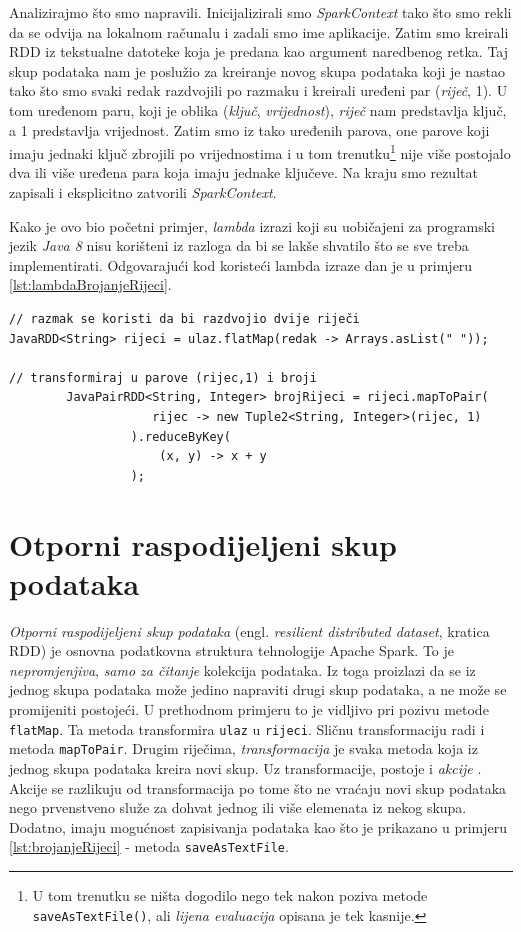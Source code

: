 \documentclass[times, utf8, zavrsni, numeric]{fer}
\begin{document}
Analizirajmo što smo napravili. Inicijalizirali smo \emph{SparkContext} tako što smo rekli da se odvija na lokalnom računalu i zadali smo ime aplikacije. Zatim smo kreirali RDD iz tekstualne datoteke koja je predana kao argument naredbenog retka. Taj skup podataka nam je poslužio za kreiranje novog skupa podataka koji je nastao tako što smo svaki redak razdvojili po razmaku i kreirali uređeni par (\emph{riječ}, 1). U tom uređenom paru, koji je oblika (\emph{ključ}, \emph{vrijednost}), \emph{riječ} nam predstavlja ključ, a 1 predstavlja vrijednost. Zatim smo iz tako uređenih parova, one parove koji imaju jednaki ključ zbrojili po vrijednostima i u tom trenutku\footnote{U tom trenutku se ništa dogodilo nego tek nakon poziva metode \texttt{saveAsTextFile()}, ali \emph{lijena evaluacija}  opisana je tek kasnije.} nije više postojalo dva ili više uređena para koja imaju jednake ključeve. Na kraju smo rezultat zapisali i eksplicitno zatvorili \emph{SparkContext}. 

Kako je ovo bio početni primjer, \emph{lambda} izrazi koji su uobičajeni za programski jezik \emph{Java 8} nisu korišteni iz razloga da bi se lakše shvatilo što se sve treba implementirati. Odgovarajući kod koristeći lambda izraze dan je u primjeru \ref{lst:lambdaBrojanjeRijeci}.
\vspace{5mm}
\begin{lstlisting}[label={lst:lambdaBrojanjeRijeci}, caption={Brojanje riječi koristeći lambda izraze.}]
// razmak se koristi da bi razdvojio dvije riječi
JavaRDD<String> rijeci = ulaz.flatMap(redak -> Arrays.asList(" "));

// transformiraj u parove (rijec,1) i broji
		JavaPairRDD<String, Integer> brojRijeci = rijeci.mapToPair(
				 	rijec -> new Tuple2<String, Integer>(rijec, 1)
				 ).reduceByKey(
					 (x, y) -> x + y
				 );
\end{lstlisting}
\vspace{5mm}


\section{Otporni raspodijeljeni skup podataka}
\emph{Otporni raspodijeljeni skup podataka} (engl. \emph{resilient distributed dataset}, kratica RDD) je osnovna podatkovna struktura tehnologije Apache Spark. To je \emph{nepromjenjiva}, \emph{samo za čitanje}  kolekcija podataka. Iz toga proizlazi da se iz jednog skupa podataka može jedino napraviti drugi skup podataka, a ne može se promijeniti postojeći. U prethodnom primjeru to je vidljivo pri pozivu metode \texttt{flatMap}. Ta metoda transformira \texttt{ulaz} u  \texttt{rijeci}. Sličnu transformaciju radi i metoda \texttt{mapToPair}. Drugim riječima, \emph{transformacija}  je svaka metoda koja iz jednog skupa podataka kreira novi skup. Uz transformacije, postoje i \emph{akcije} . Akcije se razlikuju od transformacija po tome što ne vraćaju novi skup podataka nego prvenstveno služe za dohvat jednog ili više elemenata iz nekog skupa. Dodatno, imaju mogućnost zapisivanja podataka kao što je prikazano u primjeru \ref{lst:brojanjeRijeci} - metoda \texttt{saveAsTextFile}.
\end{document}
